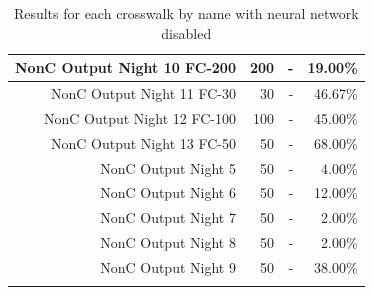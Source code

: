 \documentclass[12pt]{ucthesis}
\begin{document}
\begin{longtable}{|r|r|r|r|}
    \hline
    NonC Output Night 10 FC-200 & 200 & -  & 19.00\% \bigstrut\\
    \hline
    NonC Output Night 11 FC-30 & 30 & -  & 46.67\% \bigstrut\\
    \hline
    NonC Output Night 12 FC-100 & 100 & -  & 45.00\% \bigstrut\\
    \hline
    NonC Output Night 13 FC-50 & 50 & -  & 68.00\% \bigstrut\\
    \hline
    NonC Output Night 5 & 50 & -  & 4.00\% \bigstrut\\
    \hline
    NonC Output Night 6 & 50 & -  & 12.00\% \bigstrut\\
    \hline
    NonC Output Night 7 & 50 & -  & 2.00\% \bigstrut\\
    \hline
    NonC Output Night 8 & 50 & -  & 2.00\% \bigstrut\\
    \hline
    NonC Output Night 9 & 50 & -  & 38.00\% \bigstrut\\
    \hline

    
    \caption{Results for each crosswalk by name with neural network disabled}
    \label{tab:appendixcrosswalkresultswithoutNeural} 
    \end{longtable}
\end{document}
